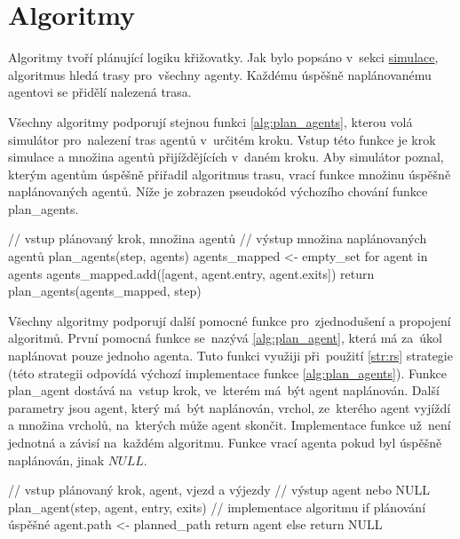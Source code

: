 \chapter{Algoritmy}\label{ch:algoritmy}

%

Algoritmy tvoří plánující logiku křižovatky.
Jak bylo popsáno v~sekci \hyperref[sec:simulace]{simulace}, algoritmus hledá trasy pro~všechny agenty.
Každému úspěšně naplánovanému agentovi se přidělí nalezená trasa.

Všechny algoritmy podporují stejnou funkci \ref{alg:plan_agents},
kterou volá simulátor pro~nalezení tras agentů v~určitém kroku.
Vstup této funkce je krok simulace a množina agentů přijíždějících v~daném kroku.
Aby simulátor poznal, kterým agentům úspěšně přiřadil algoritmus trasu,
vrací funkce množinu úspěšně naplánovaných agentů.
Níže je zobrazen pseudokód výchozího chování funkce
\textrm{plan\_agents}.

\begin{code}[fontsize=\footnotesize]
// vstup plánovaný krok, množina agentů
// výstup množina naplánovaných agentů
plan_agents(step, agents)
  agents_mapped <- empty_set
  for agent in agents
    agents_mapped.add([agent, agent.entry, agent.exits])
  return plan_agents(agents_mapped, step)
\end{code}

Všechny algoritmy podporují další pomocné funkce pro~zjednodušení a propojení algoritmů.
První pomocná funkce se~nazývá \ref{alg:plan_agent},
která má za~úkol naplánovat pouze jednoho agenta.
Tuto funkci využiji při~použití \ref{str:rs} strategie
(této strategii odpovídá výchozí implementace funkce \ref{alg:plan_agents}).
Funkce \textrm{plan\_agent}
dostává na~vstup krok, ve~kterém má~být agent naplánován.
Další parametry jsou agent, který má~být naplánován, vrchol,
ze~kterého agent vyjíždí a množina vrcholů, na~kterých může agent skončit.
Implementace funkce už~není jednotná a závisí na~každém algoritmu.
Funkce vrací agenta pokud byl úspěšně naplánován, jinak $NULL$.

\begin{code}[fontsize=\footnotesize]
// vstup plánovaný krok, agent, vjezd a výjezdy
// výstup agent nebo NULL
plan_agent(step, agent, entry, exits)
  // implementace algoritmu
  if plánování úspěšné
    agent.path <- planned_path
    return agent
  else
    return NULL
\end{code}

